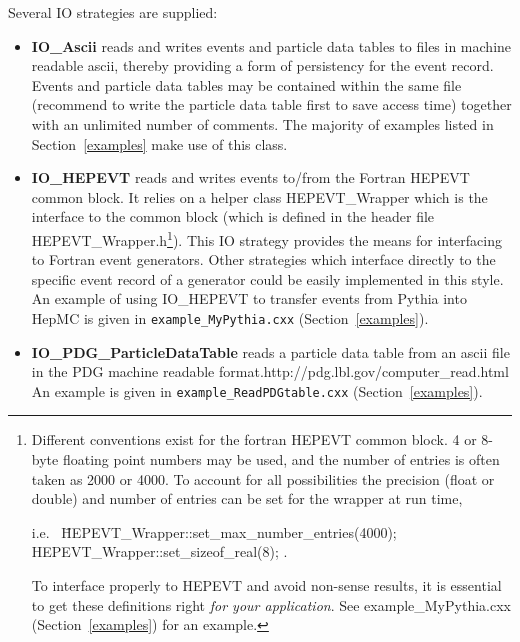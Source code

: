 \documentclass[11pt,letterpaper]{article}
\begin{document}
Several IO strategies are supplied:
\begin{itemize}\setlength{\itemsep}{0pt}
  \item {\bf IO\_Ascii} reads and writes events and particle data
    tables to files in machine readable ascii, thereby providing a
    form of persistency for the event record. Events and particle data
    tables may be contained within the same file (recommend to write
    the particle data table first to save access time) together with
    an unlimited number of comments. The majority of examples listed in
    Section~\ref{examples} make use of this class.
  \item {\bf IO\_HEPEVT} reads and writes events to/from the Fortran HEPEVT
    common block. It relies on a helper class HEPEVT\_Wrapper which
    is the interface to the common block
    (which is defined in the header file HEPEVT\_Wrapper.h\footnote{
      Different conventions exist for the fortran HEPEVT common
      block. 4 or 8-byte floating point numbers may be used, and the
      number of entries is often taken as 2000 or 4000. To account for
      all possibilities the precision (float or double) and number of
      entries can be set for the wrapper at run time,
      \begin{tabbing}
      i.e.\ \hspace{1cm} \= HEPEVT\_Wrapper::set\_max\_number\_entries(4000);\\
                         \> HEPEVT\_Wrapper::set\_sizeof\_real(8); 
            \hspace{1cm} .
      \end{tabbing}
      To interface properly to HEPEVT and avoid non-sense
      results, it is essential to get these definitions right
      {\it for your application}. See example\_MyPythia.cxx
      (Section~\ref{examples}) for an example.
      }).
    This IO strategy
    provides the means for interfacing to Fortran event
    generators. Other strategies which interface directly to the
    specific event record of a generator could be easily implemented
    in this style. An example of using IO\_HEPEVT to transfer events
    from Pythia into HepMC is given in \verb!example_MyPythia.cxx! 
    (Section~\ref{examples}).
  \item {\bf IO\_PDG\_ParticleDataTable} reads a particle data table
    from an ascii file in the \htmladdnormallinkfoot
    {PDG machine readable
      format.}{http://pdg.lbl.gov/computer\_read.html}
    An example is given in \verb!example_ReadPDGtable.cxx! 
    (Section~\ref{examples}).
\end{itemize}
\end{document}
